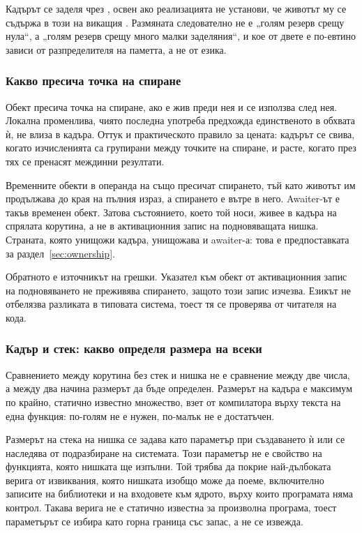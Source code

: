 Кадърът се заделя чрез , освен ако реализацията не установи, че животът му
се съдържа в този на викащия \cite{cpp20standard}. Размяната следователно не е „голям резерв
срещу нула“, а „голям резерв срещу много малки заделяния“, и кое от двете е по-евтино зависи
от разпределителя на паметта, а не от езика.

\subsubsection{Какво пресича точка на спиране}

Обект пресича точка на спиране, ако е жив преди нея и се използва след нея. Локална
променлива, чиято последна употреба предхожда единственото  в обхвата ѝ, не
влиза в кадъра. Оттук и практическото правило за цената: кадърът се свива, когато
изчисленията са групирани между точките на спиране, и расте, когато през тях се пренасят
междинни резултати.

Временните обекти в операнда на  също пресичат спирането, тъй като животът им
продължава до края на пълния израз, а спирането е вътре в него. Awaiter-ът е такъв временен
обект. Затова състоянието, което той носи, живее в кадъра на спрялата корутина, а не в
активационния запис на подновяващата нишка. Страната, която унищожи кадъра, унищожава и
awaiter-а: това е предпоставката за раздел~\ref{sec:ownership}.

Обратното е източникът на грешки. Указател към обект от активационния запис на подновяването
не преживява спирането, защото този запис изчезва. Езикът не отбелязва разликата в типовата
система, тоест тя се проверява от читателя на кода.

\subsubsection{Кадър и стек: какво определя размера на всеки}

Сравнението между корутина без стек и нишка не е сравнение между две числа, а между два
начина размерът да бъде определен. Размерът на кадъра е максимум по крайно, статично известно
множество, взет от компилатора върху текста на една функция: по-голям не е нужен, по-малък не
е достатъчен.

Размерът на стека на нишка се задава като параметър при създаването ѝ или се наследява от
подразбиране на системата. Този параметър не е свойство на функцията, която нишката ще
изпълни. Той трябва да покрие най-дълбоката верига от извиквания, която нишката изобщо може
да поеме, включително записите на библиотеки и на входовете към ядрото, върху които
програмата няма контрол. Такава верига не е статично известна за произволна програма, тоест
параметърът се избира като горна граница със запас, а не се извежда.

